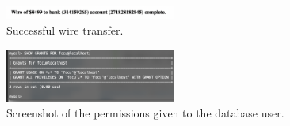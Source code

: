 \documentclass[a4paper,11pt,hidelinks]{article}
\begin{document}
\begin{figure}[hb!]
  \centering
  \includegraphics[width=0.5\textwidth]{../drawable/wire-successful}
  \caption{Successful wire transfer.}
\end{figure}

\begin{figure}[hb!]
  \centering
  \includegraphics[width=0.5\textwidth]{../drawable/exaggerate-permissions}
  \caption{Screenshot of the permissions given to the database user.}
\end{figure}

\endgroup
\end{document}
